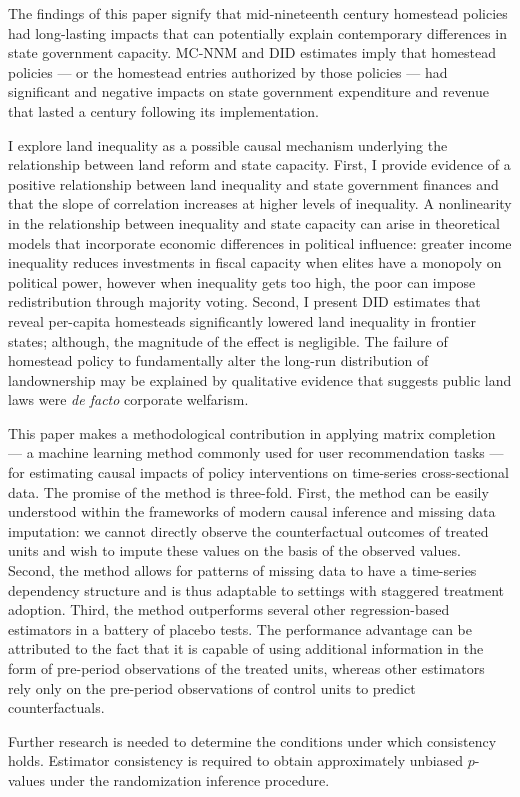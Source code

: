 The findings of this paper signify that mid-nineteenth century homestead policies had long-lasting impacts that can potentially explain contemporary differences in state government capacity. MC-NNM and DID estimates imply that homestead policies --- or the homestead entries authorized by those policies --- had significant and negative impacts on state government expenditure and revenue that lasted a century following its implementation.  

I explore land inequality as a possible causal mechanism underlying the relationship between land reform and state capacity. First, I provide evidence of a positive relationship between land inequality and state government finances and that the slope of correlation increases at higher levels of inequality. A nonlinearity in the relationship between inequality and state capacity can arise in theoretical models that incorporate economic differences in political influence: greater income inequality reduces investments in fiscal capacity when elites have a monopoly on political power, however when inequality gets too high, the poor can impose redistribution through majority voting. Second, I present DID estimates that reveal per-capita homesteads significantly lowered land inequality in frontier states; although, the magnitude of the effect is negligible. The failure of homestead policy to fundamentally alter the long-run distribution of landownership may be explained by qualitative evidence that suggests public land laws were \emph{de facto} corporate welfarism. 

This paper makes a methodological contribution in applying matrix completion --- a machine learning method commonly used for user recommendation tasks --- for estimating causal impacts of policy interventions on time-series cross-sectional data. The promise of the method is three-fold. First, the method can be easily understood within the frameworks of modern causal inference and missing data imputation: we cannot directly observe the counterfactual outcomes of treated units and wish to impute these values on the basis of the observed values. Second, the method allows for patterns of missing data to have a time-series dependency structure and is thus adaptable to settings with staggered treatment adoption. Third, the method outperforms several other regression-based estimators in a battery of placebo tests. The performance advantage can be attributed to the fact that it is capable of using additional information in the form of pre-period observations of the treated units, whereas other estimators rely only on the pre-period observations of control units to predict counterfactuals. 

Further research is needed to determine the conditions under which consistency holds. Estimator consistency is required to obtain approximately unbiased $p$-values under the randomization inference procedure. 
